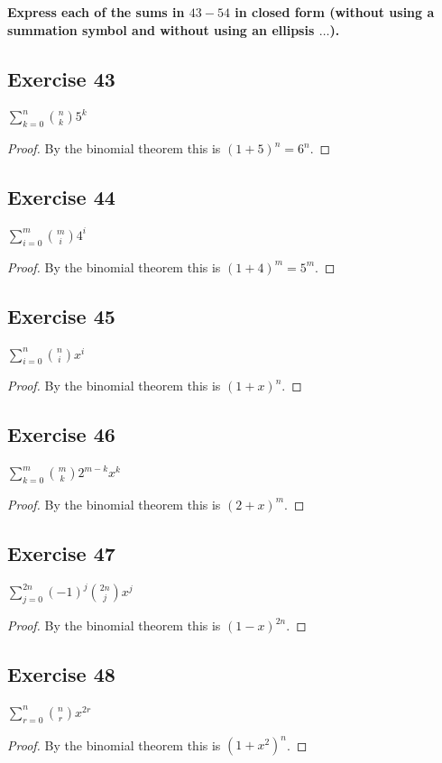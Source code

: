 \documentclass[14pt]{extarticle}
\newcommand{\dps}{\displaystyle}
\newcommand{\cy}{\color{cyan}}
\begin{document}
{\bf \cy Express each of the sums in \(43-54\) in closed form (without using a summation symbol and without using an 
ellipsis \(\ldots\)).}

\subsection{Exercise 43}
\(\sum_{k=0}^{n} \binom{n}{k} 5^{k}\)
\begin{proof}
By the binomial theorem this is \((1+5)^n = 6^n\).
\end{proof}

\subsection{Exercise 44}
\(\dps \sum_{i=0}^{m} \binom{m}{i} 4^{i}\)
\begin{proof}
By the binomial theorem this is \((1+4)^m = 5^m\).
\end{proof}

\subsection{Exercise 45}
\(\dps \sum_{i=0}^{n} \binom{n}{i} x^{i}\)
\begin{proof}
By the binomial theorem this is \((1+x)^n\).
\end{proof}

\subsection{Exercise 46}
\(\dps \sum_{k=0}^{m} \binom{m}{k} 2^{m-k}x^k\)
\begin{proof}
By the binomial theorem this is \((2+x)^m\).
\end{proof}

\subsection{Exercise 47}
\(\dps \sum_{j=0}^{2n} (-1)^j \binom{2n}{j} x^{j}\)
\begin{proof}
By the binomial theorem this is \((1-x)^{2n}\).
\end{proof}

\subsection{Exercise 48}
\(\dps \sum_{r=0}^{n} \binom{n}{r} x^{2r}\)
\begin{proof}
By the binomial theorem this is \((1+x^2)^n\).
\end{proof}
\end{document}
